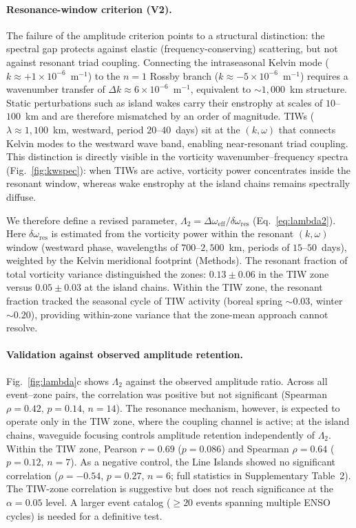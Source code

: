 \documentclass[11pt]{article}
\begin{document}
\paragraph{Resonance-window criterion (V2).}
The failure of the amplitude criterion points to a structural distinction: the spectral gap protects against elastic (frequency-conserving) scattering, but not against resonant triad coupling. Connecting the intraseasonal Kelvin mode ($k \approx +1 \times 10^{-6}$~m$^{-1}$) to the $n = 1$ Rossby branch ($k \approx -5 \times 10^{-6}$~m$^{-1}$) requires a wavenumber transfer of $\Delta k \approx 6 \times 10^{-6}$~m$^{-1}$, equivalent to ${\sim}1{,}000$~km structure. Static perturbations such as island wakes carry their enstrophy at scales of $10$--$100$~km and are therefore mismatched by an order of magnitude. TIWs ($\lambda \approx 1{,}100$~km, westward, period $20$--$40$~days\cite{KennanFlament2000}) sit at the $(k, \omega)$ that connects Kelvin modes to the westward wave band, enabling near-resonant triad coupling\cite{Lyman2005}. This distinction is directly visible in the vorticity wavenumber--frequency spectra (Fig.~\ref{fig:kwspec}): when TIWs are active, vorticity power concentrates inside the resonant window, whereas wake enstrophy at the island chains remains spectrally diffuse.

We therefore define a revised parameter, $\Lambda_2 = \Delta\omega_\mathrm{eff} / \delta\omega_\mathrm{res}$ (Eq.~\ref{eq:lambda2}). Here $\delta\omega_\mathrm{res}$ is estimated from the vorticity power within the resonant $(k, \omega)$ window (westward phase, wavelengths of $700$--$2{,}500$~km, periods of $15$--$50$~days), weighted by the Kelvin meridional footprint (Methods). The resonant fraction of total vorticity variance distinguished the zones: $0.13 \pm 0.06$ in the TIW zone versus $0.05 \pm 0.03$ at the island chains. Within the TIW zone, the resonant fraction tracked the seasonal cycle of TIW activity (boreal spring ${\sim}0.03$, winter ${\sim}0.20$), providing within-zone variance that the zone-mean approach cannot resolve.

\paragraph{Validation against observed amplitude retention.}
Fig.~\ref{fig:lambda}c shows $\Lambda_2$ against the observed amplitude ratio. Across all event--zone pairs, the correlation was positive but not significant (Spearman $\rho = 0.42$, $p = 0.14$, $n = 14$). The resonance mechanism, however, is expected to operate only in the TIW zone, where the coupling channel is active; at the island chains, waveguide focusing controls amplitude retention independently of $\Lambda_2$. Within the TIW zone, Pearson $r = 0.69$ ($p = 0.086$) and Spearman $\rho = 0.64$ ($p = 0.12$, $n = 7$). As a negative control, the Line Islands showed no significant correlation ($\rho = -0.54$, $p = 0.27$, $n = 6$; full statistics in Supplementary Table~2). The TIW-zone correlation is suggestive but does not reach significance at the $\alpha = 0.05$ level. A larger event catalog ($\geq 20$ events spanning multiple ENSO cycles) is needed for a definitive test.
\end{document}

